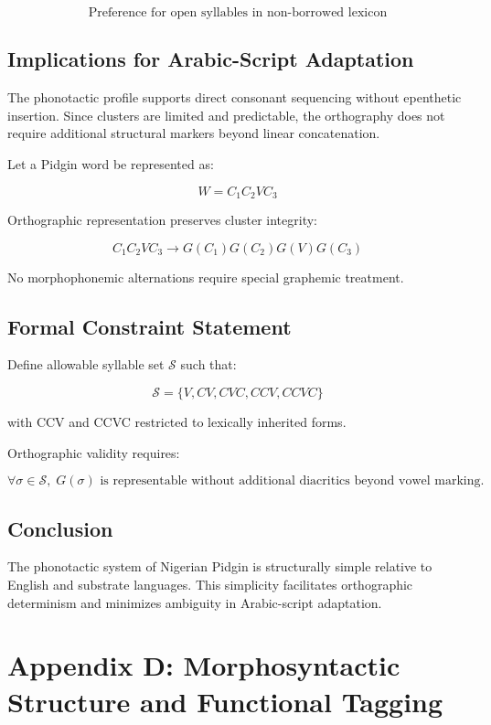 \documentclass[12pt]{article}
\begin{document}
\[
\text{Preference for open syllables in non-borrowed lexicon}
\]

\subsection{Implications for Arabic-Script Adaptation}

The phonotactic profile supports direct consonant sequencing without epenthetic insertion. Since clusters are limited and predictable, the orthography does not require additional structural markers beyond linear concatenation.

Let a Pidgin word be represented as:

\[
W = C_1 C_2 V C_3
\]

Orthographic representation preserves cluster integrity:

\[
C_1 C_2 V C_3 \rightarrow G(C_1)G(C_2)G(V)G(C_3)
\]

No morphophonemic alternations require special graphemic treatment.

\subsection{Formal Constraint Statement}

Define allowable syllable set \( \mathcal{S} \) such that:

\[
\mathcal{S} = \{ V, CV, CVC, CCV, CCVC \}
\]

with CCV and CCVC restricted to lexically inherited forms.

Orthographic validity requires:

\[
\forall \sigma \in \mathcal{S}, \; G(\sigma) \text{ is representable without additional diacritics beyond vowel marking.}
\]

\subsection{Conclusion}

The phonotactic system of Nigerian Pidgin is structurally simple relative to English and substrate languages. This simplicity facilitates orthographic determinism and minimizes ambiguity in Arabic-script adaptation.

\section{Appendix D: Morphosyntactic Structure and Functional Tagging}
\end{document}
